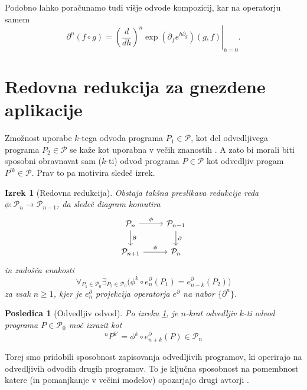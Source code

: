 \documentclass[a4paper, 12pt]{book}
\newcommand{\dP}{\mathcal{P}}
\newcommand{\D}{\partial}
\newtheorem{posledica}{Posledica}[chapter]
\newtheorem{izrek}{Izrek}[chapter]
\begin{document}
Podobno lahko poračunamo tudi višje odvode kompozicij, kar na operatorju samem
 \begin{equation}\label{eq:dkompo}
 \D^n(f\circ g)=\left.\left(\frac{d}{dh}\right)^n\exp\left(\D_fe^{h\D_g}\right)(g,f)\right|_{h=0}.
 \end{equation}

\section{Redovna redukcija za gnezdene aplikacije}\label{sec:orderReduction}

Zmožnost uporabe $k$-tega odvoda programa $P_1\in\dP$, kot del odvedljivega programa $P_2\in\dP$ se kaže kot uporabna v večih znanostih \cite{StatMC}. A zato bi morali biti sposobni obravnavat sam ($k$-ti) odvod programa $P\in\dP$ kot odvedljiv progam $P^{\prime k}\in\dP$. Prav to pa motivira sledeč izrek.
\begin{izrek}[Redovna redukcija]\label{izr:reductionMap}
Obstaja takšna preslikava redukcije reda $\phi:\dP_n\to \dP_{n-1}$, da sledeč diagram komutira
\begin{equation}\label{eq:reductionMap}
\begin{tikzcd}
  \dP_n \arrow{r}{\phi} \arrow{d}{\D} & 
  \dP_{n-1} \arrow{d}{\D}\\
  \dP_{n+1} \arrow{r}{\phi} & 
  \dP_{n}
\end{tikzcd}
\end{equation}
in zadošča enakosti
\begin{equation*}
\forall_{P_1\in\dP_0}\exists_{P_2\in\dP_0}\Big(\phi^k\circ e^\D_n(P_1)=e^\D_{n-k}(P_2)\Big)
\end{equation*}
za vsak $n\ge 1$, kjer je $e^\D_n$ projekcija operatorja $e^\D$ na nabor $\{\D^n\}$.
\end{izrek}  
\begin{posledica}[Odvedljiv odvod]\label{cor:extraxtDerivatives}
Po izreku \ref{izr:reductionMap}, je $n$-krat odvedljiv $k$-ti odvod programa $P\in\dP_0$ moč izrazit kot
\begin{equation*}
^{n}P^{k\prime}=\phi^k\circ e^\D_{n+k}(P)\in\dP_n
\end{equation*}
\end{posledica}   

Torej smo pridobili sposobnost zapisovanja odvedljivih programov, ki operirajo na odvedljivih odvodih drugih programov. To je ključna sposobnost na pomembnost katere (in pomanjkanje v večini modelov) opozarjajo drugi avtorji \cite{AD1}\cite{AD2}. 
\end{document}
